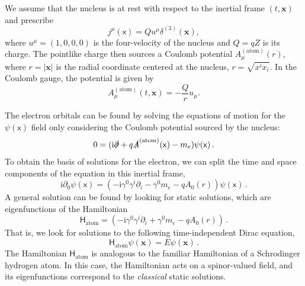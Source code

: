 \documentclass[letterpaper,12pt,titlepage,oneside,final]{book}
\newcommand{\mf}{\mathsf}%
\newcommand{\ii}{\mathrm{i}}
\begin{document}
We assume that the nucleus is at rest with respect to the inertial frame $(t,\bm x)$ and prescribe
\begin{equation}\label{eq:nucleusJmu}
    j^\mu(\mf x) = Q u^\mu \delta^{(3)}(\bm x ),
\end{equation}
where $u^\mu = (1,0,0,0)$ is the four-velocity of the nucleus and $Q = {qZ}$ is its charge. The pointlike charge then sources a Coulomb potential $A^{(\text{atom})}_\mu(r)$, where $r = |\bm x|$ is the radial coordinate centered at the nucleus, $r = \sqrt{x^i x_i}$. In the Coulomb gauge, the potential is given by
\begin{equation}\label{atom-potential}
    A_{\mu}^{(\text{atom})}(t, \bm{x}) = 
        -  \frac{Q}{r} u_\mu.
\end{equation}


The electron orbitals can be found by solving the equations of motion for the $\psi(\mf x)$ field only considering the Coulomb potential sourced by the nucleus: 
\begin{equation}\label{Dirac-eqn-atom}
    0=(\ii\slashed{\partial} +  q\slashed{A}^{(\text{atom})}(\mathsf{x}) - m_e)\psi(\mathsf{x}) \, .
\end{equation}
To obtain the basis of solutions for the electron, we can split the time and space components of the equation in this inertial frame, 
\begin{equation}\label{Dirac-eqn-atom-split}
    \ii\partial_0\psi(\mathsf{x}) = (-\ii\gamma^0\gamma^i\partial_i - \gamma^0m_e - qA_0(r))\psi(\mathsf{x}) \, .
\end{equation}
A general solution can be found by looking for static solutions, which are eigenfunctions of the Hamiltonian
\begin{equation}\label{H-Dirac-atom}
    \mathsf{H}_{\text{atom}} = (-\ii\gamma^0\gamma^i\partial_i + \gamma^0m_e - qA_0(r)) \, .
\end{equation}
That is, we look for solutions to the following time-independent Dirac equation,
\begin{equation}\label{TIDE-atom}
    \mathsf{H}_{\text{atom}}\psi(\bm{x}) = E\psi(\bm{x}) \, .
\end{equation}
The Hamiltonian $\mathsf{H}_\text{atom}$ is analogous to the familiar Hamiltonian of a Schrodinger hydrogen atom. In this case, the Hamiltonian acts on a spinor-valued field, and its eigenfunctions correspond to the \emph{classical} static solutions. 
\end{document}
